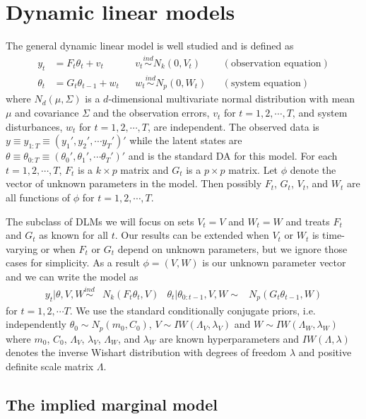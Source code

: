 \documentclass[12pt]{article}
\begin{document}
\section{Dynamic linear models} \label{sec:DLM}

The general dynamic linear model is well studied \citep{harrison1999bayesian,petris2009dynamic,prado2010time} and is defined as
\begin{align*}
y_t &= F_t\theta_t + v_t && v_t \stackrel{ind}{\sim} N_k(0,V_t) && (\mbox{observation equation}) \\
 \theta_t &= G_t\theta_{t-1} + w_t && w_t \stackrel{ind}{\sim} N_p(0,W_t) && (\mbox{system equation}) 
\end{align*}
where $N_d(\mu,\Sigma)$ is a $d$-dimensional multivariate normal distribution with mean $\mu$ and covariance $\Sigma$ and the observation errors, $v_{t}$ for $t=1,2,\cdots,T$, and system disturbances, $w_{t}$ for $t=1,2,\cdots,T$, are independent. The observed data is $y\equiv y_{1:T} \equiv (y_1',y_2',\cdots y_T')'$ while the latent states are $\theta \equiv \theta_{0:T} \equiv (\theta_0',\theta_1',\cdots \theta_T')'$ and is the standard DA for this model. For each $t=1,2,\cdots,T$, $F_t$ is a $k\times p$ matrix and $G_t$ is a $p\times p$ matrix. Let $\phi$ denote the vector of unknown parameters in the model. Then possibly $F_{t}$, $G_{t}$, $V_{t}$, and $W_{t}$ are all functions of $\phi$ for $t=1,2,\cdots,T$.

The subclass of DLMs we will focus on sets $V_t=V$ and $W_t=W$ and treats $F_{t}$ and $G_{t}$ as known for all $t$. Our results can be extended when $V_t$ or $W_t$ is time-varying or when $F_t$ or $G_t$ depend on unknown parameters, but we ignore those cases for simplicity. As a result $\phi=(V,W)$ is our unknown parameter vector and we can write the model as
\begin{align}
  y_t|\theta,V,W \stackrel{ind}{\sim} & N_k(F_t\theta_t,V) &
  \theta_t|\theta_{0:t-1},V,W  \sim & N_p(G_t\theta_{t-1},W) \label{dlmbotheqs}
\end{align}
for $t=1,2,\cdots T$. We use the standard conditionally conjugate priors, i.e. independently $\theta_0 \sim N_p(m_0, C_0)$, $V \sim IW(\Lambda_V, \lambda_V)$ and $W \sim IW(\Lambda_W, \lambda_W)$ where $m_0$, $C_0$, $\Lambda_V$, $\lambda_V$, $\Lambda_W$, and $\lambda_W$ are known hyperparameters and $IW(\Lambda, \lambda)$ denotes the inverse Wishart distribution with degrees of freedom $\lambda$ and positive definite scale matrix $\Lambda$.

\subsection{The implied marginal model}\label{sec:DLM:marg}
\end{document}
